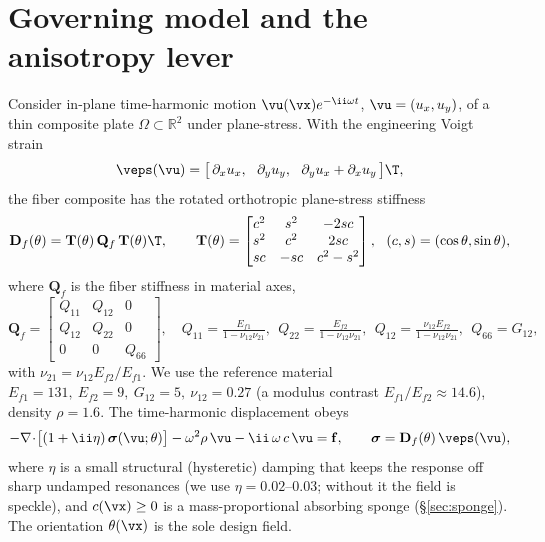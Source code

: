 \documentclass[11pt]{article}
\begin{document}
\section{Governing model and the anisotropy lever}
\label{sec:model}
Consider in-plane time-harmonic motion $\vu(\vx)e^{-\ii\omega t}$,
$\vu=(u_x,u_y)$, of a thin composite plate $\Omega\subset\mathbb R^2$ under
plane-stress. With the engineering Voigt strain
\begin{equation}
  \veps(\vu)=\bigl[\,\partial_x u_x,\ \ \partial_y u_y,\ \
  \partial_y u_x+\partial_x u_y\,\bigr]\T,
\end{equation}
the fiber composite has the rotated orthotropic plane-stress stiffness
\begin{equation}
  \mathbf D_f(\theta)=\mathbf T(\theta)\,\mathbf Q_f\,\mathbf T(\theta)\T,\qquad
  \mathbf T(\theta)=\begin{bmatrix} c^2 & s^2 & -2sc\\ s^2 & c^2 & 2sc\\
  sc & -sc & c^2-s^2\end{bmatrix},\ \ (c,s)=(\cos\theta,\sin\theta),
  \label{eq:Df}
\end{equation}
where $\mathbf Q_f$ is the fiber stiffness in material axes,
\begin{equation}
  \mathbf Q_f=\begin{bmatrix} Q_{11}&Q_{12}&0\\ Q_{12}&Q_{22}&0\\
  0&0&Q_{66}\end{bmatrix},\quad
  Q_{11}=\tfrac{E_{f1}}{1-\nu_{12}\nu_{21}},\ \
  Q_{22}=\tfrac{E_{f2}}{1-\nu_{12}\nu_{21}},\ \
  Q_{12}=\tfrac{\nu_{12}E_{f2}}{1-\nu_{12}\nu_{21}},\ \ Q_{66}=G_{12},
\end{equation}
with $\nu_{21}=\nu_{12}E_{f2}/E_{f1}$. We use the reference material
$E_{f1}=131,\ E_{f2}=9,\ G_{12}=5,\ \nu_{12}=0.27$ (a modulus contrast
$E_{f1}/E_{f2}\approx14.6$), density $\rho=1.6$. The time-harmonic displacement
obeys
\begin{equation}
  -\nabla\!\cdot\!\bigl[(1+\ii\eta)\,\bm\sigma(\vu;\theta)\bigr]
  -\omega^2\rho\,\vu-\ii\,\omega\,c\,\vu=\mathbf f,\qquad
  \bm\sigma=\mathbf D_f(\theta)\,\veps(\vu),
  \label{eq:strong}
\end{equation}
where $\eta$ is a small structural (hysteretic) damping that keeps the response
off sharp undamped resonances (we use $\eta=0.02$--$0.03$; without it the field is
speckle), and $c(\vx)\ge0$ is a mass-proportional absorbing sponge
(\S\ref{sec:sponge}). The orientation $\theta(\vx)$ is the sole design field.
\end{document}

